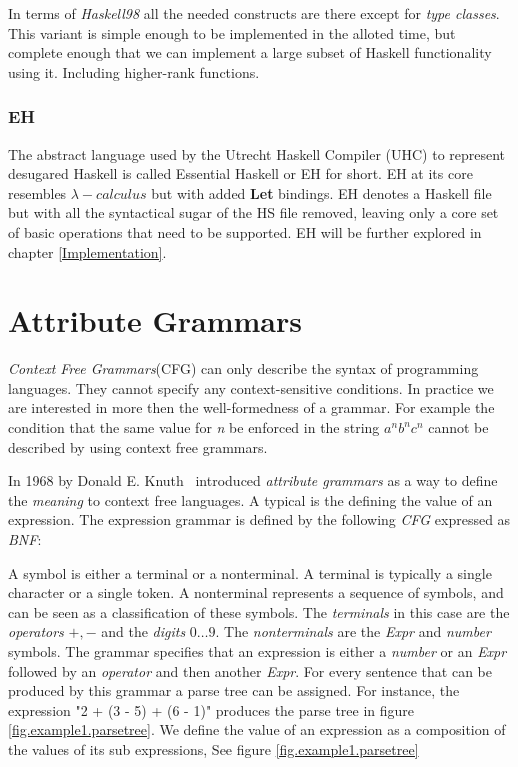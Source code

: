 \documentclass[twoside, titlepage, openright, a4paper]{book}
\newcommand{\ags}{\emph{attribute grammars }}
\begin{document}
In terms of \emph{Haskell98} all the needed constructs are there except for \emph{type classes}. This variant is simple enough to be implemented in the alloted time, but complete enough that we can implement a large subset of Haskell functionality using it. Including higher-rank functions.

\subsection{EH}
The abstract language used by the Utrecht Haskell Compiler (UHC) to represent desugared Haskell is called Essential Haskell or EH for short. EH at its core resembles $\lambda-calculus$ but with added \textbf{Let} bindings. EH denotes a Haskell file but with all the syntactical sugar of the HS file removed, leaving only a core set of basic operations that need to be supported. EH will be further explored in chapter \ref{Implementation}.

\chapter{Attribute Grammars}
\label{AG}
\emph{Context Free Grammars}(CFG) can only describe the syntax of programming languages\cite{knuth1}. They cannot specify any context-sensitive conditions. In practice we are interested in more then the well-formedness of a grammar. For example the condition that the same value for \emph{n} be enforced in the string $a^nb^nc^n$ cannot be described by using context free grammars\cite{ken}.

In 1968 by Donald E. Knuth~\cite{knuth1} introduced \ags as a way to define the \emph{meaning} to context free languages. A typical is the defining the value of an expression. The expression grammar is defined by the following \emph{CFG} expressed as \emph{BNF}:



A symbol is either a terminal or a nonterminal. A terminal is typically a single character or a single token. A nonterminal represents a sequence of symbols, and can be seen as a classification of these symbols.
The \emph{terminals} in this case are the \emph{operators} $+,-$ and the \emph{digits} $0\ldots 9$. The \emph{nonterminals} are the \emph{Expr} and \emph{number} symbols. The grammar specifies that an expression is either a \emph{number} or an \emph{Expr} followed by an \emph{operator} and then another \emph{Expr}. For every sentence that can be produced by this grammar a parse tree can be assigned. For instance, the expression "2 + (3 - 5) + (6 - 1)" produces the parse tree in figure \ref{fig.example1.parsetree}. We define the value of an expression as a composition of the values of its sub expressions, See figure \ref{fig.example1.parsetree}
\end{document}

